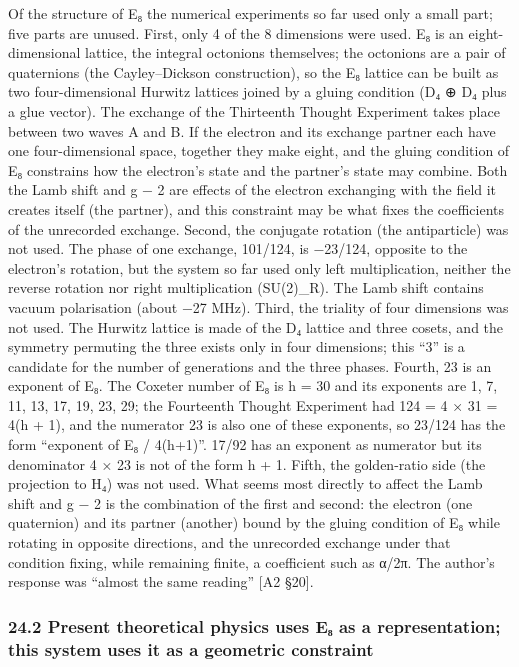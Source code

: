 \documentclass[
  a4paper,
]{article}
\begin{document}
Of the structure of E₈ the numerical experiments so far used only a
small part; five parts are unused. First, only 4 of the 8 dimensions
were used. E₈ is an eight-dimensional lattice, the integral octonions
themselves; the octonions are a pair of quaternions (the Cayley--Dickson
construction), so the E₈ lattice can be built as two four-dimensional
Hurwitz lattices joined by a gluing condition (D₄ ⊕ D₄ plus a glue
vector). The exchange of the Thirteenth Thought Experiment takes place
between two waves A and B. If the electron and its exchange partner each
have one four-dimensional space, together they make eight, and the
gluing condition of E₈ constrains how the electron's state and the
partner's state may combine. Both the Lamb shift and g − 2 are effects
of the electron exchanging with the field it creates itself (the
partner), and this constraint may be what fixes the coefficients of the
unrecorded exchange. Second, the conjugate rotation (the antiparticle)
was not used. The phase of one exchange, 101/124, is −23/124, opposite
to the electron's rotation, but the system so far used only left
multiplication, neither the reverse rotation nor right multiplication
(SU(2)\_R). The Lamb shift contains vacuum polarisation (about −27 MHz).
Third, the triality of four dimensions was not used. The Hurwitz lattice
is made of the D₄ lattice and three cosets, and the symmetry permuting
the three exists only in four dimensions; this ``3'' is a candidate for
the number of generations and the three phases. Fourth, 23 is an
exponent of E₈. The Coxeter number of E₈ is h = 30 and its exponents are
1, 7, 11, 13, 17, 19, 23, 29; the Fourteenth Thought Experiment had 124
= 4 × 31 = 4(h + 1), and the numerator 23 is also one of these
exponents, so 23/124 has the form ``exponent of E₈ / 4(h+1)''. 17/92 has
an exponent as numerator but its denominator 4 × 23 is not of the form h
+ 1. Fifth, the golden-ratio side (the projection to H₄) was not used.
What seems most directly to affect the Lamb shift and g − 2 is the
combination of the first and second: the electron (one quaternion) and
its partner (another) bound by the gluing condition of E₈ while rotating
in opposite directions, and the unrecorded exchange under that condition
fixing, while remaining finite, a coefficient such as α/2π. The author's
response was ``almost the same reading'' {[}A2 §20{]}.

\subsubsection{24.2 Present theoretical physics uses E₈ as a
representation; this system uses it as a geometric
constraint}\label{present-theoretical-physics-uses-eux2088-as-a-representation-this-system-uses-it-as-a-geometric-constraint}
\end{document}
